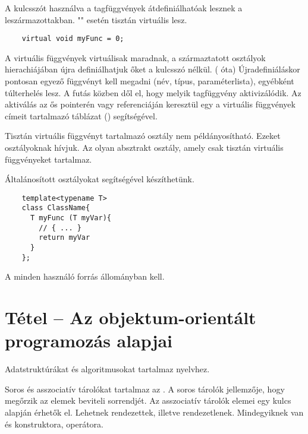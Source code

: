\documentclass[main.tex]{subfiles}
\begin{document}
  A  kulcsszót használva a tagfüggvények
  átdefiniálhatóak lesznek a leszármazottakban.
  "" esetén tisztán virtuális lesz.
  \begin{lstlisting}
    virtual void myFunc = 0;
  \end{lstlisting}
  A virtuális függvények virtuálisak maradnak,
  a származtatott osztályok hierachiájában újra definiálhatjuk
  őket a  kulcsszó nélkül. ( óta)
  Újradefiniáláskor pontosan egyező függvényt kell megadni
  (név, típus, paraméterlista), egyébként túlterhelés lesz.
  A futás közben dől el, hogy melyik tagfüggvény aktivizálódik.
  Az aktiválás az ős pointerén vagy referenciáján keresztül
  egy a virtuális függvények címeit tartalmazó
  táblázat () segítségével.

  Tisztán virtuális függvényt tartalmazó osztály nem példányosítható.
  Ezeket  osztályoknak hívjuk.
  Az  olyan absztrakt osztály,
  amely csak tisztán virtuális függvényeket tartalmaz.

  Általánosított osztályokat 
  segítségével készíthetünk.
  \begin{lstlisting}
    template<typename T>
    class ClassName{
      T myFunc (T myVar){
        // { ... }
        return myVar
      }
    };
  \end{lstlisting}
  A  minden használó forrás állományban kell.


  \pagebreak
  \section{Tétel – Az objektum-orientált programozás alapjai} %

  Adatstruktúrákat és algoritmusokat tartalmaz
   nyelvhez.

  Soros és asszociatív tárolókat tartalmaz az .
  A soros tárolók jellemzője,
  hogy megőrzik az elemek beviteli sorrendjét.
  Az asszociatív tárolók elemei egy kulcs alapján érhetők el.
  Lehetnek rendezettek, illetve rendezetlenek.
  Mindegyiknek van  és 
  konstruktora, \kkod{=} operátora.
\end{document}
